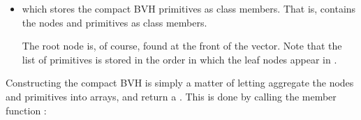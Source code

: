 \documentclass[letterpaper,10pt,english]{sphinxmanual}
\begin{document}
\begin{itemize}
\item {} 
\sphinxAtStartPar
{} which stores the compact BVH  primitives as class members.
That is,  contains the nodes and primitives as class members.

\begin{sphinxVerbatim}[commandchars=\\\{\}]
        
    


       
    
\end{sphinxVerbatim}

\sphinxAtStartPar
The root node is, of course, found at the front of the  vector.
Note that the list of primitives  is stored in the order in which the leaf nodes appear in .

\end{itemize}

\sphinxAtStartPar
Constructing the compact BVH is simply a matter of letting  aggregate the nodes and primitives into arrays, and return a .
This is done by calling the  member function :
\end{document}
